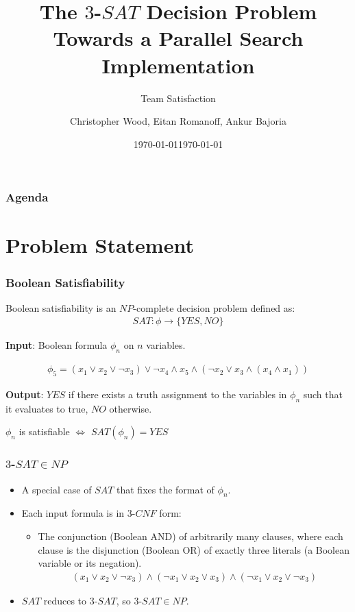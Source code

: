 \documentclass[handout,10pt]{beamer}
\title[Team Satisfaction - $3$-$SAT$]{The $3$-$SAT$ Decision Problem \\ Towards a Parallel Search Implementation}
\institute[RIT]{}
\date{\today}
\subtitle{Team Satisfaction}
\author{Christopher Wood, Eitan Romanoff, Ankur Bajoria}
\date{\today}
\begin{document}
\begin{frame}
	\titlepage
\end{frame}

\begin{frame}
	\frametitle{Agenda}
	\tableofcontents
\end{frame}

\section{Problem Statement}
\begin{frame}
	\frametitle{Boolean Satisfiability}

	Boolean satisfiability is an $NP$-complete decision problem defined as:
	\begin{align*}
	SAT : \phi \to \{YES, NO\}
	\end{align*}

	\medskip

	\textbf{Input}: Boolean formula $\phi_n$ on $n$ variables.
	
	\begin{align*}
		\phi_5 = (x_1 \lor x_2 \lor \lnot x_3) \lor \lnot x_4 \land x_5 \land (\lnot x_2 \lor x_3 \land (x_4 \land x_1))
	\end{align*}

	\medskip 

	\textbf{Output}: $YES$ if there exists a truth assignment to the
	variables in $\phi_n$ such that it evaluates to true, $NO$ otherwise.

	\medskip

	\begin{center}
		$\phi_n$ is satisfiable $\Leftrightarrow$ $SAT(\phi_n) = YES$
	\end{center}

\end{frame}


\begin{frame}
	\frametitle{$3$-$SAT \in NP$}
	\begin{itemize}
		\item A special case of $SAT$ that fixes the format of $\phi_n$.
		\item Each input formula is in $3$-$CNF$ form:
		\begin{itemize}
			\item The conjunction (Boolean AND) of arbitrarily many clauses, 
			where each clause is the disjunction (Boolean OR) of exactly three literals 
			(a Boolean variable or its negation).
			\begin{align*}
				(x_1 \lor x_2 \lor \lnot x_3) \land (\lnot x_1 \lor x_2 \lor x_3) \land (\lnot x_1 \lor x_2 \lor \lnot x_3)
			\end{align*}
		\end{itemize}
		\item $SAT$ reduces to $3$-$SAT$, so $3$-$SAT \in NP$.
	\end{itemize}
\end{frame}
\end{document}
